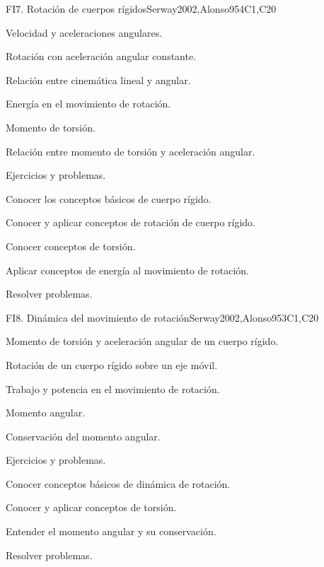 \begin{syllabus}
\begin{unit}{FI7. Rotación de cuerpos rígidos}{}{Serway2002,Alonso95}{4}{C1,C20}
\begin{topics}
      \item Velocidad y aceleraciones angulares.
      \item Rotación con aceleración angular constante.
      \item Relación entre cinemática lineal y angular.
      \item Energía en el movimiento de rotación.
      \item Momento de torsión.
      \item Relación entre momento de torsión y aceleración angular.
      \item Ejercicios y problemas.
   \end{topics}

   \begin{learningoutcomes}
      \item Conocer los conceptos básicos de cuerpo rígido.
      \item Conocer y aplicar conceptos de rotación de cuerpo rígido.
      \item Conocer conceptos de torsión.
      \item Aplicar conceptos de energía al movimiento de rotación.
      \item Resolver problemas.
   \end{learningoutcomes}
\end{unit}

\begin{unit}{FI8. Dinámica del movimiento de rotación}{}{Serway2002,Alonso95}{3}{C1,C20}
\begin{topics}
      \item Momento de torsión y aceleración angular de un cuerpo rígido.
      \item Rotación de un cuerpo rígido sobre un eje móvil.
      \item Trabajo y potencia en el movimiento de rotación.
      \item Momento angular.
      \item Conservación del momento angular.
      \item Ejercicios y problemas.
    \end{topics}

   \begin{learningoutcomes}
      \item Conocer conceptos básicos de dinámica de rotación.
      \item Conocer y aplicar conceptos de torsión.
      \item Entender el momento angular y su conservación.
      \item Resolver problemas.
   \end{learningoutcomes}
\end{unit}

\begin{coursebibliography}
\end{coursebibliography}
\end{syllabus}
